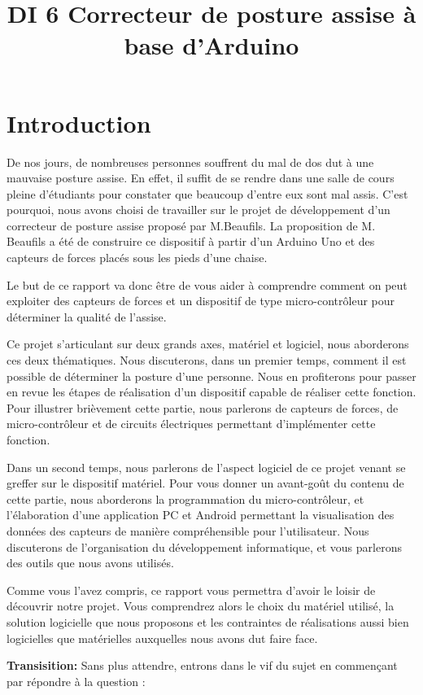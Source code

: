 \documentclass{polytech/polytech}
\title{DI 6 Correcteur de posture assise à base d'Arduino}
\begin{document}
\chapter*{Introduction}

De nos jours, de nombreuses personnes souffrent du mal de dos dut à une mauvaise posture assise. En effet, il suffit de se rendre dans une salle de cours pleine d'étudiants pour constater que beaucoup d'entre eux sont mal assis. C'est pourquoi, nous avons choisi de travailler sur le projet de développement d'un correcteur de posture assise proposé par M.Beaufils. La proposition de M. Beaufils a été de construire ce dispositif à partir d'un Arduino Uno et des capteurs de forces placés sous les pieds d'une chaise. 

Le but de ce rapport va donc être de vous aider à comprendre comment on peut exploiter des capteurs de forces et un dispositif de type micro-contrôleur pour déterminer la qualité de l'assise. 

Ce projet s'articulant sur deux grands axes, matériel et logiciel, nous aborderons ces deux thématiques.
Nous discuterons, dans un premier temps, comment il est possible de déterminer la posture d'une personne. Nous en profiterons pour passer en revue les étapes de réalisation d'un dispositif capable de réaliser cette fonction. Pour illustrer brièvement cette partie, nous parlerons de capteurs de forces, de micro-contrôleur et de circuits électriques permettant d'implémenter cette fonction.

Dans un second temps, nous parlerons de l'aspect logiciel de ce projet venant se greffer sur le dispositif matériel. Pour vous donner un avant-goût du contenu de cette partie, nous aborderons la programmation du micro-contrôleur, et l'élaboration d'une application PC et Android permettant la visualisation des données des capteurs de manière compréhensible pour l'utilisateur.
Nous discuterons de l'organisation du développement informatique, et vous parlerons des outils que nous avons utilisés.


Comme vous l'avez compris, ce rapport vous permettra d'avoir le loisir de découvrir notre projet. Vous comprendrez alors le choix du matériel utilisé, la solution logicielle que nous proposons et les contraintes de réalisations aussi bien logicielles que matérielles auxquelles nous avons dut faire face.


\textbf{Transisition:} Sans plus attendre, entrons dans le vif du sujet en commençant par répondre à la question :
\end{document}
